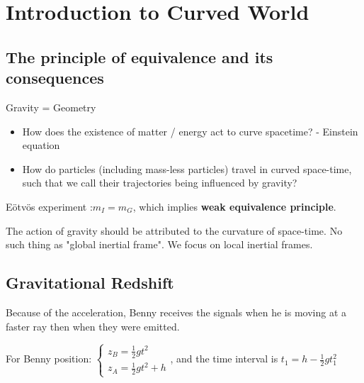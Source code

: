 \newpage

\mainmatter
{}
\chapter{Introduction to Curved World}

\newpage

\section{The principle of equivalence and its consequences}

Gravity = Geometry
\begin{itemize}
    \item How does the existence of matter / energy act to curve spacetime? - Einstein equation
    \item How do particles (including mass-less particles) travel in curved space-time, such that we call their trajectories being influenced by gravity?
\end{itemize}

Eötvös experiment :$m_{I}=m_{G}$, which implies \textbf{weak equivalence principle}.



The action of gravity should be attributed to the curvature of space-time. No such thing as "global inertial frame". We focus on local inertial frames.

\section{Gravitational Redshift}

Because of the acceleration, Benny receives the signals when he is moving at a faster ray then when they were emitted.

For Benny position: $\begin{cases}z_{B}=\frac{1}{2}gt^{2}\\z_{A}=\frac{1}{2}gt^{2}+h\end{cases}$, and the time interval is $t_{1}=h-\frac{1}{2}gt_{1}^2$ 




